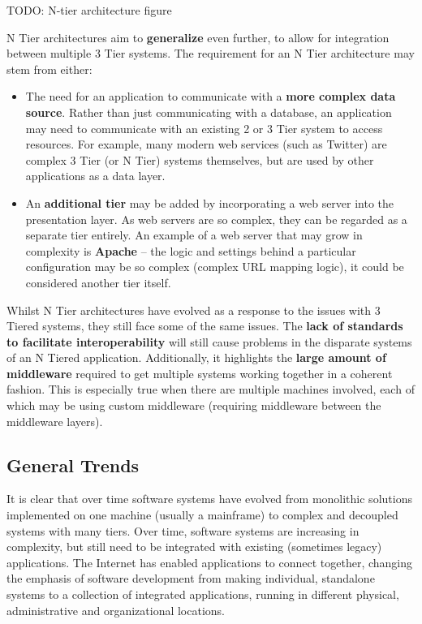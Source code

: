 \documentclass{article}
\begin{document}
TODO: N-tier architecture figure

N Tier architectures aim to \textbf{generalize} even further, to allow for integration between multiple 3 Tier systems. The requirement for an N Tier architecture may stem from either:
\begin{itemize}
    \item The need for an application to communicate with a \textbf{more complex data source}. Rather than just communicating with a database, an application may need to communicate with an existing 2 or 3 Tier system to access resources. For example, many modern web services (such as Twitter) are complex 3 Tier (or N Tier) systems themselves, but are used by other applications as a data layer.

    \item An \textbf{additional tier} may be added by incorporating a web server into the presentation layer. As web servers are so complex, they can be regarded as a separate tier entirely. An example of a web server that may grow in complexity is \textbf{Apache} -- the logic and settings behind a particular configuration may be so complex (complex URL mapping logic), it could be considered another tier itself.
\end{itemize}

Whilst N Tier architectures have evolved as a response to the issues with 3 Tiered systems, they still face some of the same issues. The \textbf{lack of standards to facilitate interoperability} will still cause problems in the disparate systems of an N Tiered application. Additionally, it highlights the \textbf{large amount of middleware} required to get multiple systems working together in a coherent fashion. This is especially true when there are multiple machines involved, each of which may be using custom middleware (requiring middleware between the middleware layers).

\subsection{General Trends}

It is clear that over time software systems have evolved from monolithic solutions implemented on one machine (usually a mainframe) to complex and decoupled systems with many tiers. Over time, software systems are increasing in complexity, but still need to be integrated with existing (sometimes legacy) applications. The Internet has enabled applications to connect together, changing the emphasis of software development from making individual, standalone systems to a collection of integrated applications, running in different physical, administrative and organizational locations. 
\end{document}
